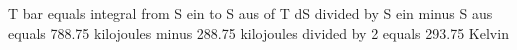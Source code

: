 T bar equals integral from S ein to S aus of T dS divided by S ein minus S aus equals 788.75 kilojoules minus 288.75 kilojoules divided by 2 equals 293.75 Kelvin